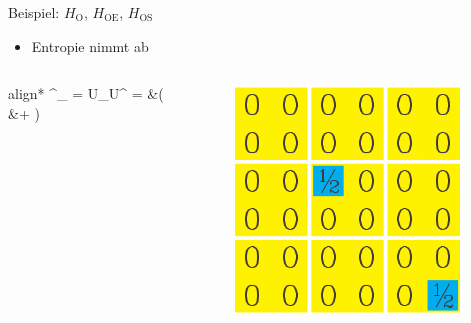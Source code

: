 \begin{frame}{Beispiel: $H_{\mathrm{O}}$, $H_{\mathrm{OE}}$, $H_{\mathrm{OS}}$}
{\begin{itemize}
\begin{itemize}
					\item{Entropie nimmt ab}
				\end{itemize}
				\vspace{0.2cm}
			\end{itemize}
			\begin{columns}
				\begin{column}{0.55\textwidth}
					\begin{beamerboxesrounded}{}
						\begin{empheq}{align*}
						\rho^{\prime}_{\mathrm{OS}} = U\rho_{}U^{\dagger} = &(\ketsmileyup\brasmileyup\\ &+ \ketfrownydown\brafrownydown)
						\end{empheq}
						\vspace{-0.5cm}
					\end{beamerboxesrounded}
				\end{column}
				\begin{column}{0.35\textwidth}
					\centering
					\includegraphics[scale=0.35]{graphics/subsystem_example_1_4.jpg}
				\end{column}
			\end{columns}}{}
\end{frame}